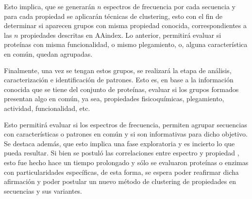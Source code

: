 Esto implica, que se generarán $n$ espectros de frecuencia por cada secuencia y para cada propiedad se aplicarán técnicas de clustering, esto con el fin de determinar si aparecen grupos con misma propiedad conocida, correspondientes a las $n$ propiedades descritas en AAindex. Lo anterior, permitirá evaluar si proteínas con misma funcionalidad, o mismo plegamiento, o, alguna característica en común, quedan agrupadas.

Finalmente, una vez se tengan estos grupos, se realizará la etapa de análisis, caracterización e identificación de patrones. Esto es, en base a la información conocida que se tiene del conjunto de proteínas, evaluar si los grupos formados presentan algo en común, ya sea, propiedades fisicoquímicas, plegamiento, actividad, funcionalidad, etc. 

Esto permitirá evaluar si los espectros de frecuencia, permiten agrupar secuencias con características o patrones en común y si son informativas para dicho objetivo. Se destaca además, que esto implica una fase exploratoria y es incierto lo que pueda resultar. Si bien se postuló las correlaciones entre espectro y propiedad \cite{veljkovic1985possible}, esto fue hecho hace un tiempo prolongado y sólo se evaluaron proteínas o enzimas con particularidades específicas, de esta forma, se espera poder reafirmar dicha afirmación y poder postular un nuevo método de clustering de propiedades en secuencias y sus variantes.

 
